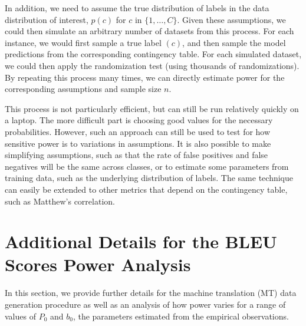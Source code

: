 \documentclass[11pt,a4paper]{article}
\begin{document}
In addition, we need to assume the true distribution of labels in the data distribution of interest, $p(c)$ for $c$ in $\{1,\ldots,C\}$. Given these assumptions, we could then simulate an arbitrary number of datasets from this process. For each instance, we would first sample a true label $(c)$, and then sample the model predictions from the corresponding contingency table. For each simulated dataset, we could then apply the randomization test (using thousands of randomizations). By repeating this process many times, we can directly estimate power for the corresponding assumptions and sample size $n$. 

This process is not particularly efficient, but can still be run relatively quickly on a laptop. The more difficult part is choosing good values for the necessary probabilities. However, such an approach can still be used to test for how sensitive power is to variations in assumptions. It is also possible to make simplifying assumptions, such as that the rate of false positives and false negatives will be the same across classes, or to estimate some parameters from training data, such as the underlying distribution of labels. The same technique can easily be extended to other metrics that depend on the contingency table, such as Matthew's correlation.


\section{Additional Details for the BLEU Scores Power Analysis}
\label{app:mt}

In this section, we provide further details for the machine translation (MT) data generation procedure as well as an analysis of how power varies for a range of values of $P_0$ and $b_0$, the parameters estimated from the empirical observations.
\end{document}
